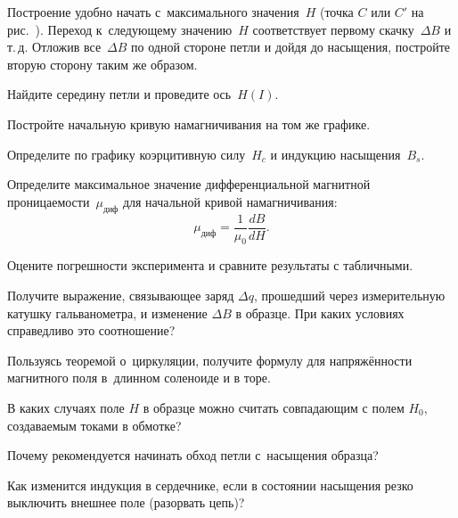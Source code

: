 \begin{lab:task}
		Построение удобно начать с~максимального значения~$H$ (точка $C$ или
$C'$ на рис.~). Переход к~следующему
значению~$H$ соответствует первому скачку~$\Delta B$ и т.\,д.
Отложив все~$\Delta B$ по одной стороне петли и дойдя до насыщения, постройте
вторую сторону таким же образом.

		Найдите середину петли и проведите ось~$H(I)$.

		\item Постройте начальную кривую намагничивания на том же графике.

		\item Определите по графику коэрцитивную силу~$H_c$ и индукцию
насыщения~$B_s$.

		\item Определите максимальное значение дифференциальной магнитной
проницаемости~$\mu_\text{диф}$ для начальной кривой
		намагничивания:
		\begin{equation*}
			\mu_\text{диф}=\frac{1}{\mu_0}\frac{dB}{dH}.
		\end{equation*}

		\item Оцените погрешности эксперимента и сравните
        результаты с табличными.


\end{lab:task}


\begin{lab:questions}

	\item Получите выражение, связывающее заряд $\Delta q$, прошедший через
    измерительную катушку гальванометра, и изменение $\Delta B$ в образце.
    При каких условиях справедливо это соотношение?

	\item Пользуясь теоремой о~циркуляции, получите формулу для напряжённости
магнитного поля в~длинном соленоиде и в торе.

    \item В каких случаях поле $H$ в образце можно считать совпадающим
    с полем $H_0$, создаваемым токами в обмотке?

    \item Почему рекомендуется начинать обход петли с~насыщения образца?

    \item Как изменится индукция в сердечнике, если в состоянии насыщения
    резко выключить внешнее поле (разорвать цепь)?
\end{lab:questions}


